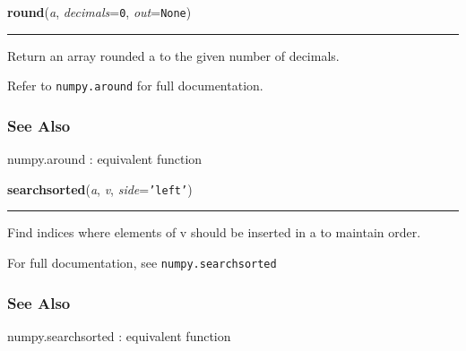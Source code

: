     \label{numpy:ndarray:round}

    \vspace{0.5ex}

    \begin{boxedminipage}{\textwidth}

    \raggedright \textbf{round}(\textit{a}, \textit{decimals}=\texttt{0}, \textit{out}=\texttt{None})

    \vspace{-1.5ex}

    \rule{\textwidth}{0.5\fboxrule}

Return an array rounded a to the given number of decimals.

Refer to \texttt{numpy.around} for full documentation.



\hypertarget{see-also}{}
\subsubsection*{See Also}

numpy.around : equivalent function
    \vspace{1ex}

    \end{boxedminipage}

    \label{numpy:ndarray:searchsorted}

    \vspace{0.5ex}

    \begin{boxedminipage}{\textwidth}

    \raggedright \textbf{searchsorted}(\textit{a}, \textit{v}, \textit{side}=\texttt{'left'})

    \vspace{-1.5ex}

    \rule{\textwidth}{0.5\fboxrule}

Find indices where elements of v should be inserted in a to maintain order.

For full documentation, see \texttt{numpy.searchsorted}



\hypertarget{see-also}{}
\subsubsection*{See Also}

numpy.searchsorted : equivalent function
    \vspace{1ex}

    \end{boxedminipage}

